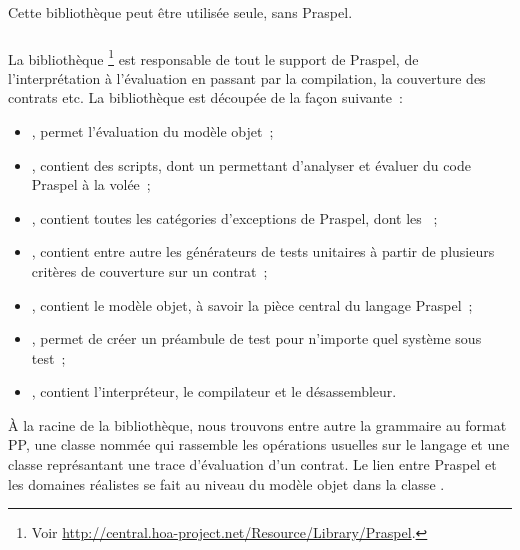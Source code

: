 Cette bibliothèque peut être utilisée seule, sans Praspel.

\subsubsection{}

La bibliothèque \footnote{Voir
\url{http://central.hoa-project.net/Resource/Library/Praspel}.} est responsable
de tout le support de Praspel, de l'interprétation à l'évaluation en passant par
la compilation, la couverture des contrats etc. La bibliothèque est découpée de
la façon suivante~:
%
\begin{itemize}

\item {}, permet l'évaluation du modèle objet~;

\item {}, contient des scripts, dont un  permettant
d'analyser et évaluer du code Praspel à la volée~;

\item {}, contient toutes les catégories d'exceptions de Praspel,
dont les ~;

\item {}, contient entre autre les générateurs de tests unitaires à
partir de plusieurs critères de couverture sur un contrat~;

\item {}, contient le modèle objet, à savoir la pièce central du
langage Praspel~;

\item {}, permet de créer un préambule de test pour n'importe quel
système sous test~;

\item {}, contient l'interpréteur, le compilateur et le
désassembleur.

\end{itemize}

À la racine de la bibliothèque, nous trouvons entre autre la grammaire au format
PP, une classe nommée  qui rassemble les opérations
usuelles sur le langage et une classe représantant une trace d'évaluation d'un
contrat. Le lien entre Praspel et les domaines réalistes se fait au niveau du
modèle objet dans la classe
.

